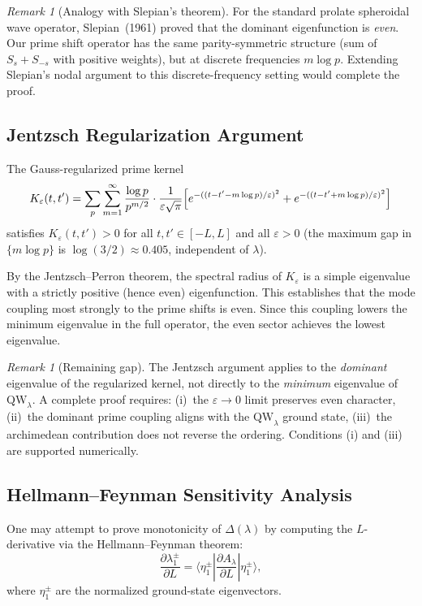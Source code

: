 \documentclass[12pt,a4paper]{article}
\theoremstyle{definition}
\theoremstyle{remark}
\newtheorem{remark}[theorem]{Remark}
\begin{document}
\begin{remark}[Analogy with Slepian's theorem]
For the standard prolate spheroidal wave operator, Slepian~(1961) proved that the dominant eigenfunction is \emph{even}. Our prime shift operator has the same parity-symmetric structure (sum of $S_s + S_{-s}$ with positive weights), but at discrete frequencies $m\log p$. Extending Slepian's nodal argument to this discrete-frequency setting would complete the proof.
\end{remark}

\subsection{Jentzsch Regularization Argument}

The Gauss-regularized prime kernel
\[ K_\varepsilon(t,t') = \sum_p \sum_{m=1}^\infty \frac{\log p}{p^{m/2}} \cdot \frac{1}{\varepsilon\sqrt\pi} \Bigl[e^{-((t-t'-m\log p)/\varepsilon)^2} + e^{-((t-t'+m\log p)/\varepsilon)^2}\Bigr] \]
satisfies $K_\varepsilon(t,t') > 0$ for all $t,t' \in [-L,L]$ and all $\varepsilon > 0$ (the maximum gap in $\{m\log p\}$ is $\log(3/2) \approx 0.405$, independent of $\lambda$).

By the Jentzsch--Perron theorem, the spectral radius of $K_\varepsilon$ is a simple eigenvalue with a strictly positive (hence even) eigenfunction. This establishes that the mode coupling most strongly to the prime shifts is even. Since this coupling lowers the minimum eigenvalue in the full operator, the even sector achieves the lowest eigenvalue.

\begin{remark}[Remaining gap]
The Jentzsch argument applies to the \emph{dominant} eigenvalue of the regularized kernel, not directly to the \emph{minimum} eigenvalue of $\mathrm{QW}_\lambda$. A complete proof requires: (i)~the $\varepsilon \to 0$ limit preserves even character, (ii)~the dominant prime coupling aligns with the $\mathrm{QW}_\lambda$ ground state, (iii)~the archimedean contribution does not reverse the ordering. Conditions (i) and (iii) are supported numerically.
\end{remark}

\subsection{Hellmann--Feynman Sensitivity Analysis}
\label{sec:hellmann-feynman}

One may attempt to prove monotonicity of $\Delta(\lambda)$ by computing the $L$-derivative via the Hellmann--Feynman theorem:
\[ \frac{\partial \lambda_1^\pm}{\partial L} = \langle \eta_1^\pm | \frac{\partial A_\lambda}{\partial L} | \eta_1^\pm \rangle, \]
where $\eta_1^\pm$ are the normalized ground-state eigenvectors.
\end{document}
